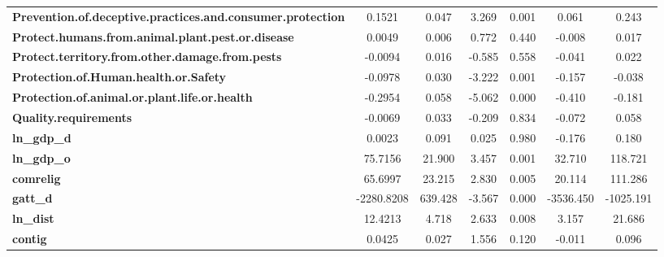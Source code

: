 \begin{center}
\begin{tabular}{lcccccc}
\textbf{Prevention.of.deceptive.practices.and.consumer.protection} &       0.1521  &        0.047     &     3.269  &         0.001        &        0.061    &        0.243     \\
\textbf{Protect.humans.from.animal.plant.pest.or.disease}          &       0.0049  &        0.006     &     0.772  &         0.440        &       -0.008    &        0.017     \\
\textbf{Protect.territory.from.other.damage.from.pests}            &      -0.0094  &        0.016     &    -0.585  &         0.558        &       -0.041    &        0.022     \\
\textbf{Protection.of.Human.health.or.Safety}                      &      -0.0978  &        0.030     &    -3.222  &         0.001        &       -0.157    &       -0.038     \\
\textbf{Protection.of.animal.or.plant.life.or.health}              &      -0.2954  &        0.058     &    -5.062  &         0.000        &       -0.410    &       -0.181     \\
\textbf{Quality.requirements}                                      &      -0.0069  &        0.033     &    -0.209  &         0.834        &       -0.072    &        0.058     \\
\textbf{ln\_gdp\_d}                                                &       0.0023  &        0.091     &     0.025  &         0.980        &       -0.176    &        0.180     \\
\textbf{ln\_gdp\_o}                                                &      75.7156  &       21.900     &     3.457  &         0.001        &       32.710    &      118.721     \\
\textbf{comrelig}                                                  &      65.6997  &       23.215     &     2.830  &         0.005        &       20.114    &      111.286     \\
\textbf{gatt\_d}                                                   &   -2280.8208  &      639.428     &    -3.567  &         0.000        &    -3536.450    &    -1025.191     \\
\textbf{ln\_dist}                                                  &      12.4213  &        4.718     &     2.633  &         0.008        &        3.157    &       21.686     \\
\textbf{contig}                                                    &       0.0425  &        0.027     &     1.556  &         0.120        &       -0.011    &        0.096     \\

\end{tabular}
\end{center}
